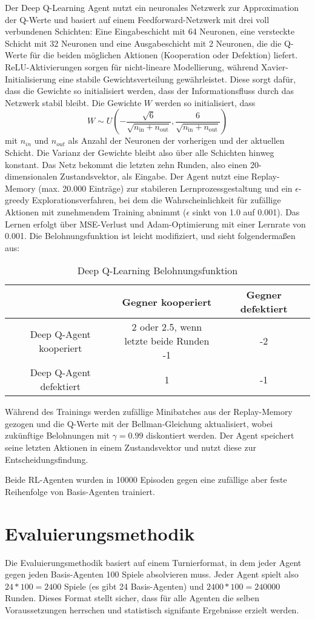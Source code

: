 Der Deep Q-Learning Agent nutzt ein neuronales Netzwerk zur Approximation der Q-Werte und basiert auf einem 
Feedforward-Netzwerk mit drei voll verbundenen Schichten: Eine Eingabeschicht mit 64 Neuronen, eine versteckte 
Schicht mit 32 Neuronen und eine Ausgabeschicht mit 2 Neuronen, die die Q-Werte für die beiden möglichen Aktionen 
(Kooperation oder Defektion) liefert. ReLU-Aktivierungen sorgen für nicht-lineare Modellierung, während Xavier-Initialisierung 
eine stabile Gewichtsverteilung gewährleistet. Diese sorgt dafür, dass die Gewichte so initialisiert werden, dass der 
Informationsfluss durch das Netzwerk stabil bleibt. Die Gewichte $W$ werden so initialisiert, dass
\begin{equation}
    W \sim U \left( -\frac{\sqrt{6}}{\sqrt{n_{\text{in}}+n_{\text{out}}}}, \frac{6}{\sqrt{n_{\text{in}}+n_{\text{out}}}} \right)
\end{equation}
mit $n_{in}$ und $n_{out}$ als Anzahl der Neuronen der vorherigen und der aktuellen Schicht. Die Varianz der Gewichte bleibt
also über alle Schichten hinweg konstant.
Das Netz bekommt die letzten zehn Runden, also einen 20-dimensionalen 
Zustandsvektor, als Eingabe. Der Agent nutzt eine Replay-Memory (max. 20.000 Einträge) zur stabileren 
Lernprozessgestaltung und ein $\epsilon$-greedy Explorationsverfahren, bei dem die Wahrscheinlichkeit für zufällige Aktionen mit 
zunehmendem Training abnimmt ($\epsilon$ sinkt von 1.0 auf 0.001). Das Lernen erfolgt über MSE-Verlust und Adam-Optimierung mit 
einer Lernrate von 0.001. Die Belohnungsfunktion ist leicht modifiziert, und sieht folgendermaßen aus:
\begin{table}[h!]
    \centering
    \begin{tabular}{c|c|c}
            & Gegner kooperiert & Gegner defektiert\\
        \hline
        Deep Q-Agent kooperiert &  \makecell{2 oder 2.5, wenn \\ letzte beide Runden -1} & -2 \\
        \hline
        Deep Q-Agent defektiert &  1 & -1 \\
    \end{tabular}
    \caption{Deep Q-Learning Belohnungsfunktion}
\end{table}
Während des Trainings werden zufällige Minibatches aus der Replay-Memory gezogen und die Q-Werte mit der Bellman-Gleichung 
aktualisiert, wobei zukünftige Belohnungen mit $\gamma=0.99$ diskontiert werden. Der Agent speichert seine letzten Aktionen 
in einem Zustandsvektor und nutzt diese zur Entscheidungsfindung.

Beide RL-Agenten wurden in 10000 Episoden gegen eine zufällige aber feste Reihenfolge von Basis-Agenten trainiert.


\section{Evaluierungsmethodik}
Die Evaluierungsmethodik basiert auf einem Turnierformat, in dem jeder Agent gegen jeden Basis-Agenten 100 Spiele 
absolvieren muss. Jeder Agent spielt also $24 * 100 = 2400$ Spiele (es gibt 24 Basis-Agenten) und $2400 * 100 = 240000$ Runden. Dieses Format
stellt sicher, dass für alle Agenten die selben Voraussetzungen herrschen und statistisch signifante Ergebnisse erzielt werden.
